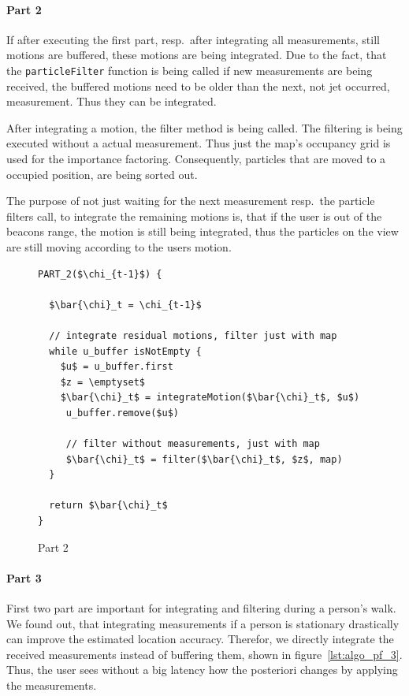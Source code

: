 \paragraph{Part 2} If after executing the first part, resp.\ after integrating all measurements, still motions are buffered, these motions are being integrated. Due to the fact, that the \texttt{particleFilter} function is being called if new measurements are being received, the buffered motions need to be older than the next, not jet occurred, measurement. Thus they can be integrated.

After integrating a motion, the filter method is being called. The filtering is being executed without a actual measurement. Thus just the map's occupancy grid is used for the importance factoring. Consequently, particles that are moved to a occupied position, are being sorted out.

The purpose of not just waiting for the next measurement resp.\ the particle filters call, to integrate the remaining motions is, that if the user is out of the beacons range, the motion is still being integrated, thus the particles on the view are still moving according to the users motion.

\begin{figure}
\begin{lstlisting}[mathescape]
PART_2($\chi_{t-1}$) {

  $\bar{\chi}_t = \chi_{t-1}$

  // integrate residual motions, filter just with map
  while u_buffer isNotEmpty {
    $u$ = u_buffer.first
    $z = \emptyset$
    $\bar{\chi}_t$ = integrateMotion($\bar{\chi}_t$, $u$)
     u_buffer.remove($u$)
     
     // filter without measurements, just with map
     $\bar{\chi}_t$ = filter($\bar{\chi}_t$, $z$, map)
  }
  
  return $\bar{\chi}_t$
}
\end{lstlisting}
\caption{Part 2}
\label{lst:algo_pf_2}
\end{figure}

\paragraph{Part 3}First two part are important for integrating and filtering during a person's walk. We found out, that integrating measurements if a person is stationary drastically can improve the estimated location accuracy. Therefor, we directly integrate the received measurements instead of buffering them, shown in figure~\ref{lst:algo_pf_3}. Thus, the user sees without a big latency how the posteriori changes by applying the measurements.

